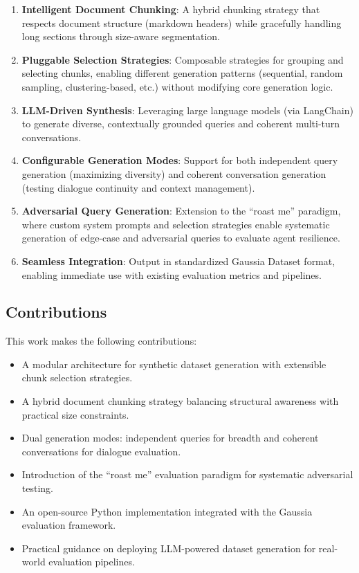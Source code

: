\documentclass[11pt,a4paper]{article}
\begin{document}
\begin{enumerate}
    \item \textbf{Intelligent Document Chunking}: A hybrid chunking strategy that respects document structure (markdown headers) while gracefully handling long sections through size-aware segmentation.

    \item \textbf{Pluggable Selection Strategies}: Composable strategies for grouping and selecting chunks, enabling different generation patterns (sequential, random sampling, clustering-based, etc.) without modifying core generation logic.

    \item \textbf{LLM-Driven Synthesis}: Leveraging large language models (via LangChain) to generate diverse, contextually grounded queries and coherent multi-turn conversations.

    \item \textbf{Configurable Generation Modes}: Support for both independent query generation (maximizing diversity) and coherent conversation generation (testing dialogue continuity and context management).

    \item \textbf{Adversarial Query Generation}: Extension to the ``roast me'' paradigm, where custom system prompts and selection strategies enable systematic generation of edge-case and adversarial queries to evaluate agent resilience.

    \item \textbf{Seamless Integration}: Output in standardized Gaussia Dataset format, enabling immediate use with existing evaluation metrics and pipelines.
\end{enumerate}

\subsection{Contributions}

This work makes the following contributions:

\begin{itemize}
    \item A modular architecture for synthetic dataset generation with extensible chunk selection strategies.
    \item A hybrid document chunking strategy balancing structural awareness with practical size constraints.
    \item Dual generation modes: independent queries for breadth and coherent conversations for dialogue evaluation.
    \item Introduction of the ``roast me'' evaluation paradigm for systematic adversarial testing.
    \item An open-source Python implementation integrated with the Gaussia evaluation framework.
    \item Practical guidance on deploying LLM-powered dataset generation for real-world evaluation pipelines.
\end{itemize}
\end{document}

